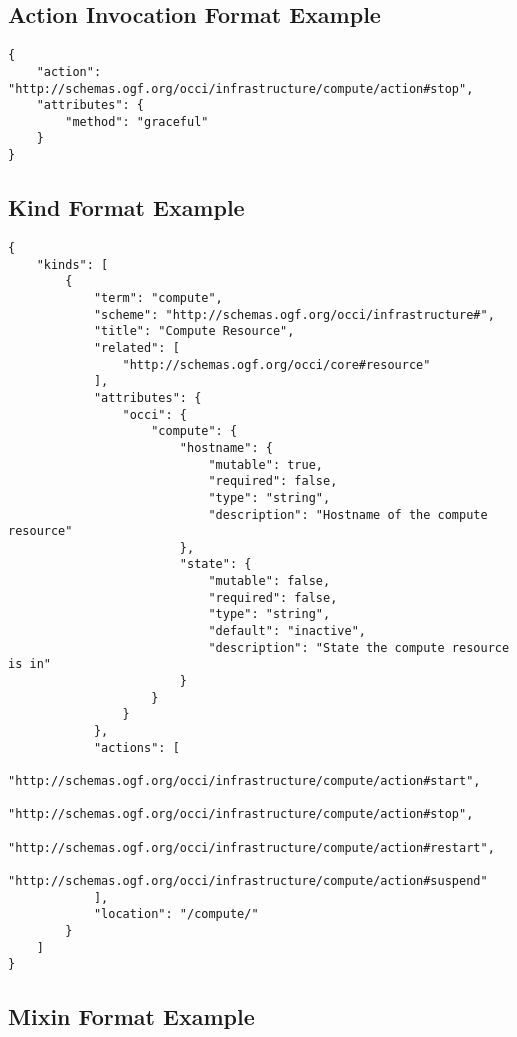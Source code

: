 \documentclass[10pt,a4paper]{article}
\begin{document}
\subsection{Action Invocation Format Example}
\label{sec:example_action_invocation}

\begin{lstlisting}
{
    "action": "http://schemas.ogf.org/occi/infrastructure/compute/action#stop",
    "attributes": {
        "method": "graceful"       
    }
}
\end{lstlisting}

\subsection{Kind Format Example}
\label{sec:example_kind}

\begin{lstlisting}
{
    "kinds": [
        {
            "term": "compute",
            "scheme": "http://schemas.ogf.org/occi/infrastructure#",
            "title": "Compute Resource",
            "related": [
                "http://schemas.ogf.org/occi/core#resource"
            ],
            "attributes": {
                "occi": {
                    "compute": {
                        "hostname": {
                            "mutable": true,
                            "required": false,
                            "type": "string",
                            "description": "Hostname of the compute resource"
                        },
                        "state": {
                            "mutable": false,
                            "required": false,
                            "type": "string",
                            "default": "inactive",
                            "description": "State the compute resource is in"
                        }
                    }
                }
            },
            "actions": [
                "http://schemas.ogf.org/occi/infrastructure/compute/action#start",
                "http://schemas.ogf.org/occi/infrastructure/compute/action#stop",
                "http://schemas.ogf.org/occi/infrastructure/compute/action#restart",
                "http://schemas.ogf.org/occi/infrastructure/compute/action#suspend"
            ],
            "location": "/compute/"
        }
    ]
}
\end{lstlisting}

\subsection{Mixin Format Example}
\label{sec:example_mixin}
\end{document}
